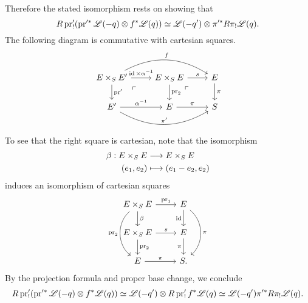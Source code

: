 \documentclass[deligne.tex]{subfiles}
\begin{document}
Therefore the stated isomorphism rests on showing that
\begin{equation*}
	R\operatorname{pr}_!'(\operatorname{pr}'^*\mathscr L(-q)\otimes f^*\mathscr L(q))
	\simeq\mathscr L(-q')\otimes\pi'^*R\pi_!\mathscr L(q).
\end{equation*}
The following diagram is commutative with cartesian squares.
\begin{equation*}\begin{tikzcd}
	E\times_SE'\arrow[r,"{\id\times\alpha^{-1}}"]\arrow[d,"\pr'"]\arrow[rr,"f",bend left]\arrow[dr,phantom,"\ulcorner",near start]
	&E\times_SE\arrow[r,"s"]\arrow[d,"\pr_2"]\arrow[dr,phantom,"\ulcorner",near start]
	&E\arrow[d,"\pi"] \\
	E'\arrow[r,"\alpha^{-1}"]\arrow[rr,"\pi'",bend right]
	&E\arrow[r,"\pi"]
	&S
\end{tikzcd}\end{equation*}
To see that the right square is cartesian, note that the isomorphism
\begin{align*}
	\beta:E\times_SE&\longrightarrow E\times_SE \\
	(e_1,e_2)&\longmapsto(e_1-e_2,e_2)
\end{align*}
induces an isomorphism of cartesian squares
\begin{equation*}\begin{tikzcd}
	E\times_SE\arrow[r,"\pr_1"]\arrow[d,"\beta"]\arrow[dd,"\pr_2"',bend right=50]
	&E\arrow[d,"\id"']\arrow[dd,"\pi",bend left=50] \\
	E\times_SE\arrow[r,"s"]\arrow[d,"\pr_2"]&E\arrow[d,"\pi"'] \\
	E\arrow[r,"\pi"]&S.
\end{tikzcd}\end{equation*}
By the projection formula and proper base change, we conclude
\begin{equation*}
	R\operatorname{pr}_!'(\operatorname{pr}'^*\mathscr L(-q)\otimes f^*\mathscr L(q))
	\simeq\mathscr L(-q')\otimes R\operatorname{pr}_!'f^*\mathscr L(q)
	\simeq\mathscr L(-q')\pi'^*R\pi_!\mathscr L(q).
\end{equation*}
	
\end{document}
